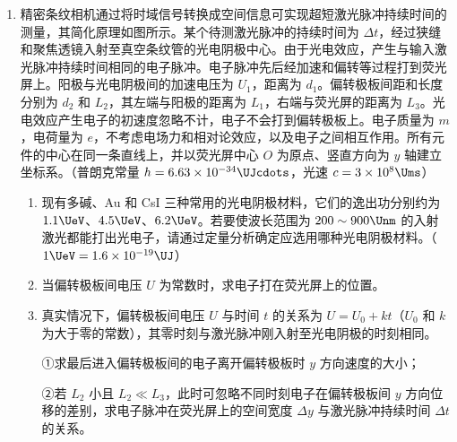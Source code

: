 \documentclass[\gkver]{gaokaozhenti}
\begin{document}
\begin{enumerate}
{联立解得 $s = \left(\frac{\sqrt{2}}{2}\pi - \frac{\sqrt{3}}{24}\pi^{2}\right)\frac{mg}{k}$
}

\item
精密条纹相机通过将时域信号转换成空间信息可实现超短激光脉冲持续时间的测量，其简化原理如图所示。某个待测激光脉冲的持续时间为 $\Delta t$，经过狭缝和聚焦透镜入射至真空条纹管的光电阴极中心。由于光电效应，产生与输入激光脉冲持续时间相同的电子脉冲。电子脉冲先后经加速和偏转等过程打到荧光屏上。阳极与光电阴极间的加速电压为 $U_{1}$，距离为 $d_{1}$。偏转极板间距和长度分别为 $d_{2}$ 和 $L_{2}$，其左端与阳极的距离为 $L_{1}$，右端与荧光屏的距离为 $L_{3}$。光电效应产生电子的初速度忽略不计，电子不会打到偏转极板上。电子质量为 $m$，电荷量为 $e$，不考虑电场力和相对论效应，以及电子之间相互作用。所有元件的中心在同一条直线上，并以荧光屏中心 $O$ 为原点、竖直方向为 $y$ 轴建立坐标系。（普朗克常量 $h = 6.63 \times 10^{-34} \UJcdots$，光速 $c = 3 \times 10^{8} \Ums$）

\begin{enumerate}
\item
现有多碱、Au 和 CsI 三种常用的光电阴极材料，它们的逸出功分别约为 $1.1 \UeV$、$4.5 \UeV$、$6.2 \UeV$。若要使波长范围为 $200 \sim 900 \Unm$ 的入射激光都能打出光电子，请通过定量分析确定应选用哪种光电阴极材料。（$1 \UeV = 1.6 \times 10^{-19} \UJ$）
\item
当偏转极板间电压 $U$ 为常数时，求电子打在荧光屏上的位置。
\item
真实情况下，偏转极板间电压 $U$ 与时间 $t$ 的关系为 $U = U_{0} + kt$（$U_{0}$ 和 $k$ 为大于零的常数），其零时刻与激光脉冲刚入射至光电阴极的时刻相同。

①求最后进入偏转极板间的电子离开偏转极板时 $y$ 方向速度的大小；

②若 $L_{2}$ 小且 $L_{2} \ll L_{3}$，此时可忽略不同时刻电子在偏转极板间 $y$ 方向位移的差别，求电子脉冲在荧光屏上的空间宽度 $\Delta y$ 与激光脉冲持续时间 $\Delta t$ 的关系。
\end{enumerate}


\end{enumerate}
\end{document}
